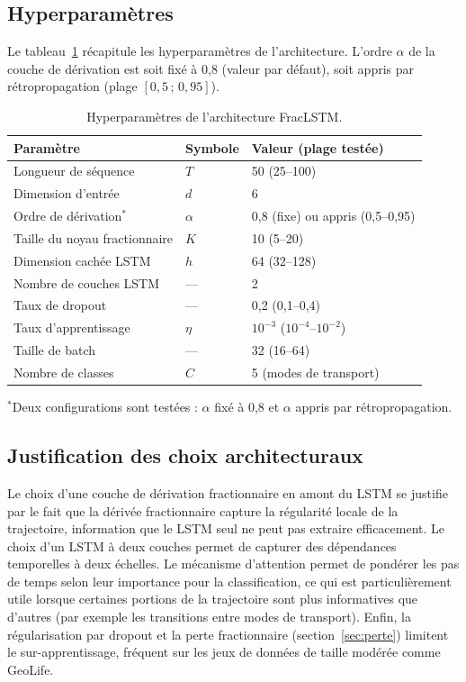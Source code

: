 \subsection{Hyperparamètres}
Le tableau~\ref{tab:hyperparametres_fraclstm} récapitule les hyperparamètres de l'architecture. L'ordre $\alpha$ de la couche de dérivation est soit fixé à 0,8 (valeur par défaut), soit appris par rétropropagation (plage $[0{,}5\,;\,0{,}95]$).

\begin{table}[H]
\centering
\caption{Hyperparamètres de l'architecture FracLSTM.}
\label{tab:hyperparametres_fraclstm}
\begin{tabular}{lll}
\toprule
Paramètre & Symbole & Valeur (plage testée) \\
\midrule
Longueur de séquence & $T$ & 50 (25--100) \\
Dimension d'entrée & $d$ & 6 \\
Ordre de dérivation$^*$ & $\alpha$ & 0,8 (fixe) ou appris (0,5--0,95) \\
Taille du noyau fractionnaire & $K$ & 10 (5--20) \\
Dimension cachée LSTM & $h$ & 64 (32--128) \\
Nombre de couches LSTM & --- & 2 \\
Taux de dropout & --- & 0,2 (0,1--0,4) \\
Taux d'apprentissage & $\eta$ & $10^{-3}$ ($10^{-4}$--$10^{-2}$) \\
Taille de batch & --- & 32 (16--64) \\
Nombre de classes & $C$ & 5 (modes de transport) \\
\bottomrule
\end{tabular}

\medskip
{\footnotesize $^*$Deux configurations sont testées : $\alpha$ fixé à 0,8 et $\alpha$ appris par rétropropagation.}
\end{table}

\subsection{Justification des choix architecturaux}
Le choix d'une couche de dérivation fractionnaire en amont du LSTM se justifie par le fait que la dérivée fractionnaire capture la régularité locale de la trajectoire, information que le LSTM seul ne peut pas extraire efficacement. Le choix d'un LSTM à deux couches permet de capturer des dépendances temporelles à deux échelles. Le mécanisme d'attention permet de pondérer les pas de temps selon leur importance pour la classification, ce qui est particulièrement utile lorsque certaines portions de la trajectoire sont plus informatives que d'autres (par exemple les transitions entre modes de transport). Enfin, la régularisation par dropout et la perte fractionnaire (section~\ref{sec:perte}) limitent le sur-apprentissage, fréquent sur les jeux de données de taille modérée comme GeoLife.

